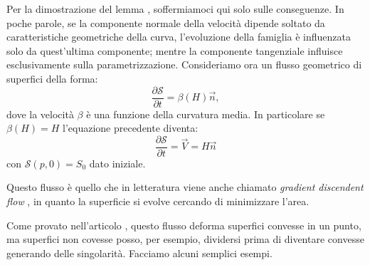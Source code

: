 Per la dimostrazione del lemma \cite[vedi][cp 2]{gui:sapiro}, soffermiamoci qui solo sulle conseguenze.
In poche parole, se la componente normale della velocità dipende soltato da caratteristiche geometriche della curva, l'evoluzione della famiglia è influenzata solo da quest'ultima componente; mentre la componente tangenziale influisce esclusivamente sulla parametrizzazione.
Consideriamo ora un flusso geometrico di superfici della forma:
\[
\frac{\partial\mathcal{S}}{\partial t} = \beta(H)\vec{n},
\] 
dove la velocità $\beta$ è una funzione della curvatura media. In particolare se $\beta(H)=H$ l'equazione precedente diventa:
\begin{equation}
  \label{eq:cp-123}
  \frac{\partial\mathcal{S}}{\partial t} = \vec{V} = H\vec{n}
\end{equation}
con $\mathcal{S}(p,0)=S_0$ dato iniziale.
\begin{osservazione}
Questo flusso è quello che in letteratura viene anche chiamato \emph{gradient discendent flow} , in quanto la superficie si evolve cercando di minimizzare l'area. 
\end{osservazione}
\begin{osservazione}
Come provato nell'articolo \cite[vedi][]{bi:chow} , questo flusso deforma superfici convesse in un punto, ma superfici non covesse posso, per esempio, dividersi prima di diventare convesse generando delle singolarità. Facciamo alcuni semplici esempi.
\end{osservazione}

